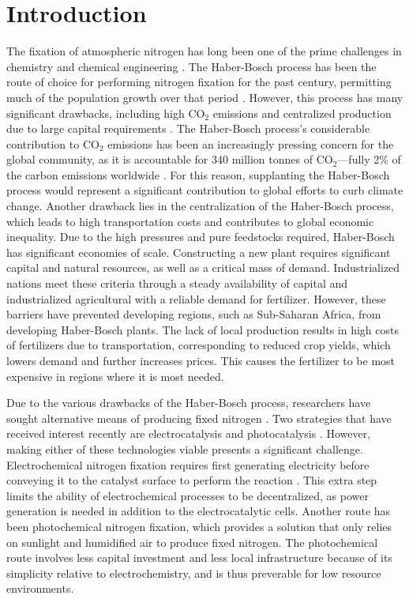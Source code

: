 \section{Introduction}
The fixation of atmospheric nitrogen has long been one of the prime challenges in chemistry and chemical engineering \cite{ritter_18, Schloegl_2003}. The Haber-Bosch process has been the route of choice for performing nitrogen fixation for the past century, permitting much of the population growth over that period \cite{Smil_1999}. However, this process has many significant drawbacks, including high CO$_2$ emissions and centralized production due to large capital requirements \cite{Comer_2019}. The Haber-Bosch process's considerable contribution to CO$_2$ emissions has been an increasingly pressing concern for the global community, as it is accountable for 340 million tonnes of CO$_2$---fully 2\% of the carbon emissions worldwide \cite{gross_12, Schiffer_2017}. For this reason, supplanting the Haber-Bosch process would represent a significant contribution to global efforts to curb climate change. Another drawback lies in the centralization of the Haber-Bosch process, which leads to high transportation costs and contributes to global economic inequality. \cite{Comer_2019} Due to the high pressures and pure feedstocks required, Haber-Bosch has significant economies of scale. Constructing a new plant requires significant capital and natural resources, as well as a critical mass of demand. Industrialized nations meet these criteria through a steady availability of capital and industrialized agricultural with a reliable demand for fertilizer. \cite{McArthur_2017} However, these barriers have prevented developing regions, such as Sub-Saharan Africa, from developing Haber-Bosch plants. The lack of local production results in high costs of fertilizers due to transportation, corresponding to reduced crop yields, which lowers demand and further increases prices. \cite{yuan_2014, IFDC_2012} This causes the fertilizer to be most expensive in regions where it is most needed.

Due to the various drawbacks of the Haber-Bosch process, researchers have sought alternative means of producing fixed nitrogen \cite{Comer_2019, McPherson_2019,WANG20181055, Kyriakou_2017}. Two strategies that have received interest recently are electrocatalysis \cite{McPherson_2019} and photocatalysis \cite{Medford_2017}. However, making either of these technologies viable presents a significant challenge. Electrochemical nitrogen fixation requires first generating electricity before conveying it to the catalyst surface to perform the reaction \cite{kyriakou_2017}. This extra step limits the ability of electrochemical processes to be decentralized, as power generation is needed in addition to the electrocatalytic cells. Another route has been photochemical nitrogen fixation, which provides a solution that only relies on sunlight and humidified air to produce fixed nitrogen. The photochemical route involves less capital investment and less local infrastructure because of its simplicity relative to electrochemistry, and is thus preverable for low resource environments.

